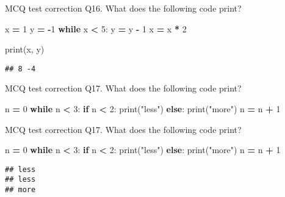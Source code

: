 \documentclass[
  8pt,
  ignorenonframetext,
]{beamer}
\newenvironment{Shaded}{\begin{snugshade}}{\end{snugshade}}
\newcommand{\BuiltInTok}[1]{#1}
\newcommand{\ControlFlowTok}[1]{\textcolor[rgb]{0.13,0.29,0.53}{\textbf{#1}}}
\newcommand{\DecValTok}[1]{\textcolor[rgb]{0.00,0.00,0.81}{#1}}
\newcommand{\NormalTok}[1]{#1}
\newcommand{\OperatorTok}[1]{\textcolor[rgb]{0.81,0.36,0.00}{\textbf{#1}}}
\newcommand{\StringTok}[1]{\textcolor[rgb]{0.31,0.60,0.02}{#1}}
\begin{document}
\begin{frame}[fragile]{MCQ test correction}
\protect\hypertarget{mcq-test-correction-31}{}
Q16. What does the following code print?

\begin{Shaded}
\begin{Highlighting}[]
\NormalTok{x }\OperatorTok{=} \DecValTok{1}
\NormalTok{y }\OperatorTok{=} \OperatorTok{{-}}\DecValTok{1}
\ControlFlowTok{while}\NormalTok{ x }\OperatorTok{\textless{}} \DecValTok{5}\NormalTok{:}
\NormalTok{    y }\OperatorTok{=}\NormalTok{ y }\OperatorTok{{-}} \DecValTok{1}
\NormalTok{    x }\OperatorTok{=}\NormalTok{ x }\OperatorTok{*} \DecValTok{2}

\BuiltInTok{print}\NormalTok{(x, y)}
\end{Highlighting}
\end{Shaded}

\begin{verbatim}
## 8 -4
\end{verbatim}
\end{frame}

\begin{frame}[fragile]{MCQ test correction}
\protect\hypertarget{mcq-test-correction-32}{}
Q17. What does the following code print?

\begin{Shaded}
\begin{Highlighting}[]
\NormalTok{n }\OperatorTok{=} \DecValTok{0}
\ControlFlowTok{while}\NormalTok{ n }\OperatorTok{\textless{}} \DecValTok{3}\NormalTok{:}
    \ControlFlowTok{if}\NormalTok{ n }\OperatorTok{\textless{}} \DecValTok{2}\NormalTok{:}
        \BuiltInTok{print}\NormalTok{(}\StringTok{"less"}\NormalTok{)}
    \ControlFlowTok{else}\NormalTok{:}
        \BuiltInTok{print}\NormalTok{(}\StringTok{"more"}\NormalTok{)}
\NormalTok{    n }\OperatorTok{=}\NormalTok{ n }\OperatorTok{+} \DecValTok{1}
\end{Highlighting}
\end{Shaded}
\end{frame}

\begin{frame}[fragile]{MCQ test correction}
\protect\hypertarget{mcq-test-correction-33}{}
Q17. What does the following code print?

\begin{Shaded}
\begin{Highlighting}[]
\NormalTok{n }\OperatorTok{=} \DecValTok{0}
\ControlFlowTok{while}\NormalTok{ n }\OperatorTok{\textless{}} \DecValTok{3}\NormalTok{:}
    \ControlFlowTok{if}\NormalTok{ n }\OperatorTok{\textless{}} \DecValTok{2}\NormalTok{:}
        \BuiltInTok{print}\NormalTok{(}\StringTok{"less"}\NormalTok{)}
    \ControlFlowTok{else}\NormalTok{:}
        \BuiltInTok{print}\NormalTok{(}\StringTok{"more"}\NormalTok{)}
\NormalTok{    n }\OperatorTok{=}\NormalTok{ n }\OperatorTok{+} \DecValTok{1}
\end{Highlighting}
\end{Shaded}

\begin{verbatim}
## less
## less
## more
\end{verbatim}
\end{frame}
\end{document}
